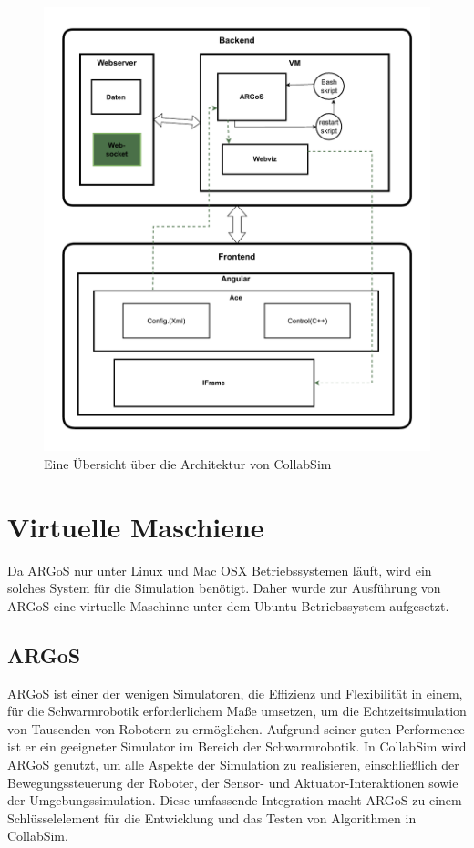 \documentclass[german,version-2020-11]{uzl-thesis}
\begin{document}
    \begin{figure}[htpb]
      \centering
      \includegraphics{figures/test8.drawio.pdf}
      \caption{Eine Übersicht über die Architektur von CollabSim}
      \label{fig-collabsim-architecture}
    \end{figure}



\section{Virtuelle Maschiene}
  Da ARGoS nur unter Linux und Mac OSX Betriebssystemen läuft, wird ein solches System für die Simulation benötigt. 
  Daher wurde zur Ausführung von ARGoS eine virtuelle Maschinne unter dem Ubuntu-Betriebssystem aufgesetzt.

  \subsection{ARGoS}
  ARGoS ist einer der wenigen Simulatoren, die Effizienz und Flexibilität in einem, für die Schwarmrobotik erforderlichem Maße umsetzen, 
  um die Echtzeitsimulation von Tausenden von Robotern zu ermöglichen\cite{Pinciroli2012}.
  Aufgrund seiner guten Performence ist er ein geeigneter Simulator im Bereich der Schwarmrobotik\cite{Shamshiri2018}. 
  In CollabSim wird ARGoS genutzt, um alle Aspekte der Simulation zu realisieren, einschließlich der Bewegungssteuerung der Roboter, 
  der Sensor- und Aktuator-Interaktionen sowie der Umgebungssimulation. 
  Diese umfassende Integration macht ARGoS zu einem Schlüsselelement für die Entwicklung und das Testen von Algorithmen in CollabSim.
\end{document}
